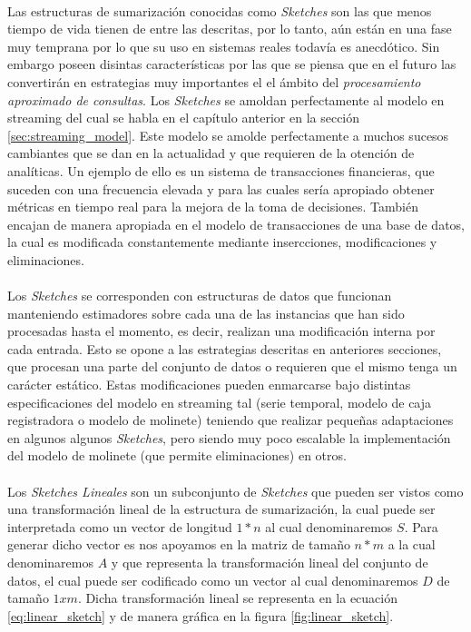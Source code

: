 \documentclass{subfiles}
\begin{document}
        \paragraph{}
        Las estructuras de sumarización conocidas como \emph{Sketches} son las que menos tiempo de vida tienen de entre las descritas, por lo tanto, aún están en una fase muy temprana por lo que su uso en sistemas reales todavía es anecdótico. Sin embargo poseen disintas características por las que se piensa que en el futuro las convertirán en estrategias muy importantes el el ámbito del \emph{procesamiento aproximado de consultas}. Los \emph{Sketches} se amoldan perfectamente al modelo en streaming del cual se habla en el capítulo anterior en la sección \ref{sec:streaming_model}. Este modelo se amolde perfectamente a muchos sucesos cambiantes que se dan en la actualidad y que requieren de la otención de analíticas. Un ejemplo de ello es un sistema de transacciones financieras, que suceden con una frecuencia elevada y para las cuales sería apropiado obtener métricas en tiempo real para la mejora de la toma de decisiones. También encajan de manera apropiada en el modelo de transacciones de una base de datos, la cual es modificada constantemente mediante insercciones, modificaciones y eliminaciones.

        \paragraph{}
        Los \emph{Sketches} se corresponden con estructuras de datos que funcionan manteniendo estimadores sobre cada una de las instancias que han sido procesadas hasta el momento, es decir, realizan una modificación interna por cada entrada. Esto se opone a las estrategias descritas en anteriores secciones, que procesan una parte del conjunto de datos o requieren que el mismo tenga un carácter estático. Estas modificaciones pueden enmarcarse bajo distintas especificaciones del modelo en streaming tal (serie temporal, modelo de caja registradora o modelo de molinete) teniendo que realizar pequeñas adaptaciones en algunos algunos \emph{Sketches}, pero siendo muy poco escalable la implementación del modelo de molinete (que permite eliminaciones) en otros.

        \paragraph{}
        Los \emph{Sketches Lineales} son un subconjunto de \emph{Sketches} que pueden ser vistos como una transformación lineal de la estructura de sumarización, la cual puede ser interpretada como un vector de longitud $1*n$ al cual denominaremos $S$. Para generar dicho vector es nos apoyamos en la matriz de tamaño $n*m$ a la cual denominaremos $A$ y que representa la transformación lineal del conjunto de datos, el cual puede ser codificado como un vector al cual denominaremos $D$ de tamaño $1xm$. Dicha transformación lineal se representa en la ecuación \eqref{eq:linear_sketch} y de manera gráfica en la figura \ref{fig:linear_sketch}.
\end{document}
